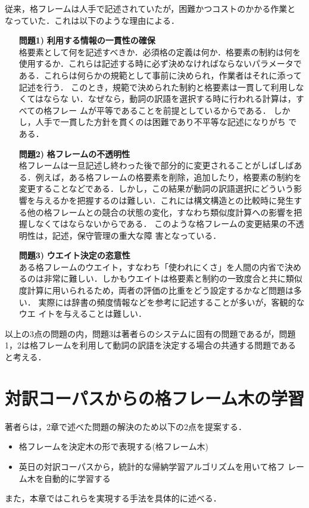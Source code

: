 従来，格フレームは人手で記述されていたが，困難かつコストのかかる作業と
なっていた．これは以下のような理由による．
\begin{enumerate}
\item[{\bf 問題1)}] {\bf 利用する情報の一貫性の確保}\\
  格要素として何を記述すべきか．必須格の定義は何か．格要素の制約は何を
  使用するか．これらは記述する時に必ず決めなければならないパラメータで
  ある．これらは何らかの規範として事前に決められ，作業者はそれに添って
  記述を行う．
  このとき，規範で決められた制約と格要素は一貫して利用しなくてはならな
  い．なぜなら，動詞の訳語を選択する時に行われる計算は，すべての格フレー
  ムが平等であることを前提としているからである．
  しかし，人手で一貫した方針を貫くのは困難であり不平等な記述になりがち
  である．

\item[{\bf 問題2)}] {\bf 格フレームの不透明性}\\
  格フレームは一旦記述し終わった後で部分的に変更されることがしばしばあ
  る．例えば，ある格フレームの格要素を削除，追加したり，格要素の制約を
  変更することなどである．しかし，この結果が動詞の訳語選択にどういう影
  響を与えるかを把握するのは難しい．これには構文構造との比較時に発生す
  る他の格フレームとの競合の状態の変化，すなわち類似度計算への影響を把
  握しなくてはならないからである．
  このような格フレームの変更結果の不透明性は，記述，保守管理の重大な障
  害となっている．

\item[{\bf 問題3)}] {\bf ウエイト決定の恣意性}\\
  ある格フレームのウエイト，すなわち「使われにくさ」を人間の内省で決め
  るのは非常に難しい．しかもウエイトは格要素と制約の一致度合と共に類似
  度計算に用いられるため，両者の評価の比重をどう設定するかなど問題は多
  い．
  実際には辞書の頻度情報などを参考に記述することが多いが，客観的なウエ
  イトを与えることは難しい．
\end{enumerate}
以上の3点の問題の内，問題3は著者らのシステムに固有の問題であるが，問題
1，2は格フレームを利用して動詞の訳語を決定する場合の共通する問題である
と考える．


\section{対訳コーパスからの格フレーム木の学習}

著者らは，2章で述べた問題の解決のため以下の2点を提案する．
\begin{itemize}
\item 格フレームを決定木の形で表現する(格フレーム木)
\item 英日の対訳コーパスから，統計的な帰納学習アルゴリズムを用いて格フ
  レーム木を自動的に学習する
\end{itemize}
また，本章ではこれらを実現する手法を具体的に述べる．

